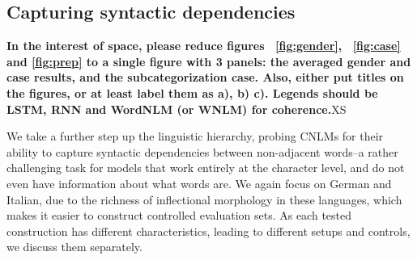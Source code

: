 \subsection{Capturing syntactic dependencies}
\label{sec:dependencies}


\textbf{In the interest of space, please reduce figures ~\ref{fig:gender}, ~\ref{fig:case} and \ref{fig:prep} to a single figure with 3 panels: the averaged gender and case results, and the subcategorization case. Also, either put titles on the figures, or at least label them as a), b) c). Legends should be LSTM, RNN and WordNLM (or WNLM) for coherence.}XS

We take a further step up the linguistic hierarchy, probing CNLMs for their ability to capture syntactic dependencies between non-adjacent words--a rather challenging task for models that work entirely at the character level, and do not even have information about what words are. We again focus on German and Italian, due to the richness of inflectional morphology in these languages, which makes it easier to construct controlled evaluation sets. As each tested construction has different characteristics, leading to different setups and controls, we discuss them separately. 





